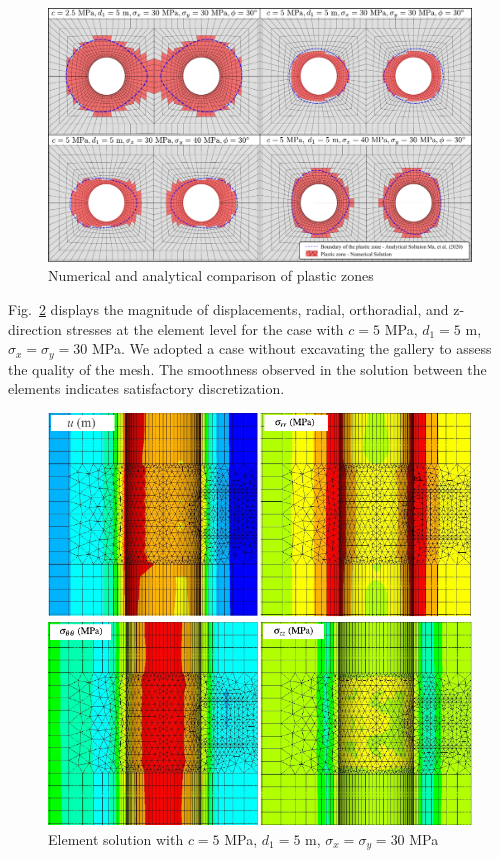 \documentclass[a4paper,fleqn]{cas-sc}
\begin{document}
\begin{figure}[h!]
	\centering
	\includegraphics[scale=0.7]{MA_FIG1.pdf}
	\caption{Numerical and analytical comparison of plastic zones}
	\label{MA_FIG1}
\end{figure}
\FloatBarrier

Fig.~\ref{MA_FIG2} displays the magnitude of displacements, radial, orthoradial, and z-direction stresses at the element level  for the case with $c=5$ MPa, $d_1=5$ m, $\sigma_x = \sigma_y = 30$ MPa. We adopted a case without excavating the gallery to assess the quality of the mesh. The smoothness observed in the solution between the elements indicates satisfactory discretization.

\begin{figure}[h!]
	\centering
	\includegraphics[scale=1]{MA_FIG2.pdf}
	\caption{Element solution with $c=5$ MPa, $d_1=5$ m, $\sigma_x = \sigma_y = 30$ MPa}
	\label{MA_FIG2}
\end{figure}
\FloatBarrier
\end{document}
